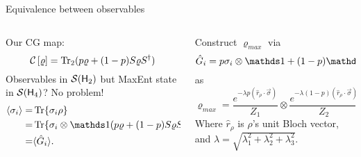 \begin{frame}{Equivalence between observables}
    \begin{columns}
        \begin{column}{0.5\textwidth}
            Our CG map:
            \begin{equation*}
                \mathcal{C}\left[\varrho\right]=\Tr_{2}(p\varrho+(1-p)S\varrho S^{\dag})
            \end{equation*}
            Observables in $\mathcal{S}({\sf H}_{2})$ but MaxEnt state in $\mathcal{S}({\sf H}_{4})$? No problem!
            \begin{align*}
                \langle \sigma_{i}\rangle=&\Tr{\sigma_{i} \rho}\\
                =&\Tr{\sigma_{i}\otimes\Id(p\varrho+(1-p)S\varrho S)}\\
                =&\langle \hat{G}_{i}\rangle.
            \end{align*}
        \end{column}
        \begin{column}{0.5\textwidth}
            Construct $\varrho_{max}$ via
            \begin{equation*}
                \hat{G}_{i}=p\sigma_{i}\otimes\Id+(1-p)\Id\otimes\sigma_{i}.
            \end{equation*}
            as
            \begin{equation*}
                \varrho_{max}=\frac{e^{-\lambda p(\hat{r}_{\rho}\cdot\vec{\sigma})}}{Z_{1}} \otimes \frac{e^{-\lambda(1-p)(\hat{r}_{\rho}\cdot\vec{\sigma})}}{Z_{2}}.
            \end{equation*}
            Where $\hat{r}_{\rho}$ is $\rho$'s unit Bloch vector, and $\lambda=\sqrt{\lambda^{2}_{1}+\lambda^{2}_{2}+\lambda^{2}_{3}}$.

        \end{column}
    \end{columns}
\end{frame}